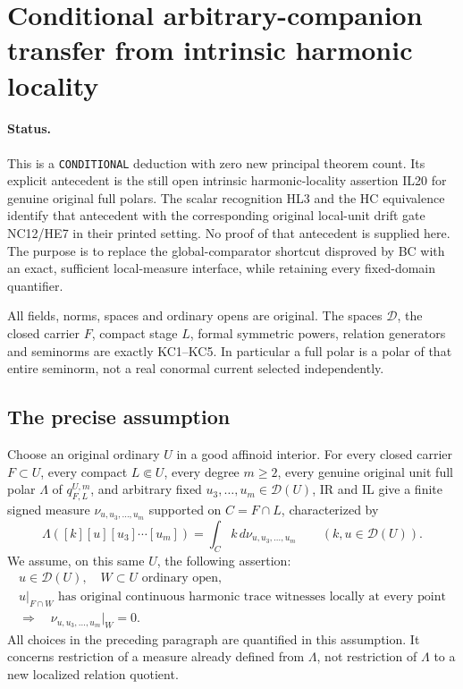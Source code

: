 \section{Conditional arbitrary-companion transfer from intrinsic harmonic locality}
\label{sec:r24-harmonic-locality-arbitrary-companions}

\paragraph{Status.}
This is a \texttt{CONDITIONAL} deduction with zero new principal
theorem count. Its explicit antecedent is the still open intrinsic
harmonic-locality assertion IL20 for genuine original full polars.
The scalar recognition HL3 and the HC equivalence identify that
antecedent with the corresponding original local-unit drift gate
NC12/HE7 in their printed setting. No proof of that antecedent is
supplied here. The purpose is to replace the global-comparator
shortcut disproved by BC with an exact, sufficient local-measure
interface, while retaining every fixed-domain quantifier.

All fields, norms, spaces and ordinary opens are original. The
spaces \(\mathcal D\), the closed carrier \(F\), compact stage \(L\),
formal symmetric powers, relation generators and seminorms are
exactly KC1--KC5. In particular a full polar is a polar of that
entire seminorm, not a real conormal current selected independently.

\subsection{The precise assumption}

Choose an original ordinary \(U\) in a good affinoid interior.
For every closed carrier \(F\subset U\), every compact
\(L\Subset U\), every degree \(m\ge2\), every genuine original
unit full polar \(\Lambda\) of \(q^{U,m}_{F,L}\), and arbitrary
fixed \(u_3,\ldots,u_m\in\mathcal D(U)\), IR and IL give a finite
signed measure \(\nu_{u,u_3,\ldots,u_m}\) supported on
\(C=F\cap L\), characterized by
\[
 \Lambda([k][u][u_3]\cdots[u_m])
       =\int_C k\,d\nu_{u,u_3,\ldots,u_m}
       \qquad(k,u\in\mathcal D(U)).                         \tag{LC24.1}
\]
We assume, on this same \(U\), the following assertion:
\[
 \begin{gathered}
 u\in\mathcal D(U),\quad W\subset U\text{ ordinary open},\\
 u|_{F\cap W}\text{ has original continuous harmonic trace
 witnesses locally at every point}\\
 \Longrightarrow\quad
 \nu_{u,u_3,\ldots,u_m}|_W=0 .
 \end{gathered}                                             \tag{LC24.2}
\]
All choices in the preceding paragraph are quantified in this
assumption. It concerns restriction of a measure already defined
from \(\Lambda\), not restriction of \(\Lambda\) to a new
localized relation quotient.

